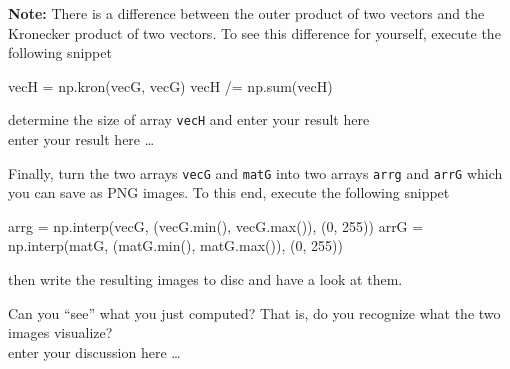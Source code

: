 \newpage
\textbf{Note:} There is a difference between the outer product of two vectors and the Kronecker product of two vectors. To see this difference for yourself, execute the following snippet
\begin{python}
vecH  = np.kron(vecG, vecG)
vecH /= np.sum(vecH)
\end{python}
determine the size of array \texttt{vecH} and enter your result here
\color{blue} \\[1ex]
enter your result here \ldots
\color{black}



\vspace{1cm}
Finally, turn the two arrays \texttt{vecG} and \texttt{matG} into two arrays \texttt{arrg} and \texttt{arrG} which you can save as PNG images. To this end, execute the following snippet 
\begin{python}
arrg = np.interp(vecG, (vecG.min(), vecG.max()), (0, 255))
arrG = np.interp(matG, (matG.min(), matG.max()), (0, 255))
\end{python}
then write the resulting images to disc and have a look at them.

Can you ``see'' what you just computed? That is, do you recognize what the two images visualize?
\color{blue} \\[1ex]
enter your discussion here \ldots
\color{black}